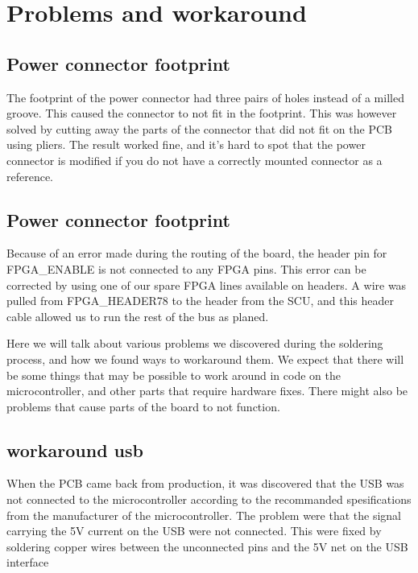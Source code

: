 \section {Problems and workaround}

\subsection{ Power connector footprint }

The footprint of the power connector had three pairs of holes instead of a milled groove.
This caused the connector to not fit in the footprint.
This was however solved by cutting away the parts of the connector that did not fit on the PCB using pliers.
The result worked fine, and it's hard to spot that the power connector is modified if you do not have a correctly mounted connector as a reference.

\subsection{ Power connector footprint }

Because of an error made during the routing of the board, the header pin for FPGA\_ENABLE is not connected to any FPGA pins.
This error can be corrected by using one of our spare FPGA lines available on headers.
A wire was pulled from FPGA\_HEADER78 to the header from the SCU, and this header cable allowed us to run the rest of the bus as planed.



Here we will talk about various problems we discovered during the soldering process, and how we found ways to workaround them.
We expect that there will be some things that may be possible to work around in code on the microcontroller, and other parts that require hardware fixes.
There might also be problems that cause parts of the board to not function.

\subsection{workaround usb}
When the PCB came back from production, it was discovered that the USB was not connected to the microcontroller
according to the recommanded spesifications from the manufacturer of the microcontroller. The problem were that the
signal carrying the 5V current on the USB were not connected. This were fixed by soldering copper wires between the unconnected pins and the 5V net on the USB interface
